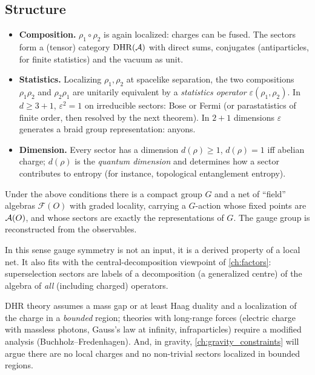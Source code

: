 \subsection{Structure}
\begin{itemize}
\item \textbf{Composition.} $\rho_1\circ\rho_2$ is again localized: charges can be fused. The sectors form a (tensor) category $\mathrm{DHR}(\mathcal{A})$ with direct sums, conjugates (antiparticles, for finite statistics) and the vacuum as unit.
\item \textbf{Statistics.} Localizing $\rho_1,\rho_2$ at spacelike separation, the two compositions $\rho_1\rho_2$ and $\rho_2\rho_1$ are unitarily equivalent by a \emph{statistics operator} $\varepsilon(\rho_1,\rho_2)$. In $d\ge3+1$, $\varepsilon^2=1$ on irreducible sectors: Bose or Fermi (or parastatistics of finite order, then resolved by the next theorem). In $2+1$ dimensions $\varepsilon$ generates a braid group representation: anyons.
\item \textbf{Dimension.} Every sector has a dimension $d(\rho)\ge1$, $d(\rho)=1$ iff abelian charge; $d(\rho)$ is the \emph{quantum dimension} and determines how a sector contributes to entropy (for instance, topological entanglement entropy).
\end{itemize}

\begin{theorem}
Under the above conditions there is a compact group $G$ and a net of ``field'' algebras $\mathcal F(O)$ with graded locality, carrying a $G$-action whose fixed points are $\mathcal{A}(O)$, and whose sectors are exactly the representations of $G$. The gauge group is reconstructed from the observables.
\end{theorem}

In this sense gauge symmetry is not an input, it is a derived property of a local net. It also fits with the central-decomposition viewpoint of \cref{ch:factors}: superselection sectors are labels of a decomposition (a generalized centre) of the algebra of \emph{all} (including charged) operators.

\begin{whatwrong}
DHR theory assumes a mass gap or at least Haag duality and a localization of the charge in a \emph{bounded} region; theories with long-range forces (electric charge with massless photons, Gauss's law at infinity, infraparticles) require a modified analysis (Buchholz--Fredenhagen). And, in gravity, \cref{ch:gravity_constraints} will argue there are no local charges and no non-trivial sectors localized in bounded regions.
\end{whatwrong}

